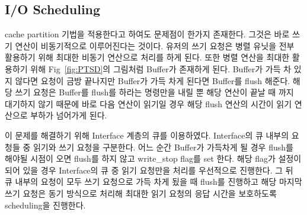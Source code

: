 \documentclass[conference]{IEEEtran}
\begin{document}
\subsection{I/O Scheduling}
cache partition 기법을 적용한다고 하여도 문제점이 한가지 존재한다. 그것은 바로 쓰기 연산이 비동기적으로 이루어진다는 것이다. 유저의 쓰기 요청은 병렬 유닛을 전부 활용하기 위해 최대한 비동기 연산으로 처리를 하게 된다. 또한 병렬 연산을 최대한 활용하기 위해 Fig~\ref{fig:PTSD}의 그림처럼 Buffer가 존재하게 된다. Buffer가 가득 차 있지 않다면 요청이 금방 끝나지만 Buffer가 가득 차게 된다면 Buffer를 flush 해준다. 해당 쓰기 요청은 Buffer를 flush를 하라는 명령만을 내릴 뿐 해당 연산이 끝날 때 까지 대기하지 않기 때문에 바로 다음 연산이 읽기일 경우 해당 flush 연산의 시간이 읽기 연산으로 부하가 넘어가게 된다.\par
이 문제를 해결하기 위해 Interface 계층의 큐를 이용하였다. Interface의 큐 내부의 요청들 중 읽기와 쓰기 요청을 구분한다. 어느 순간 Buffer가 가득차게 될 경우 flush를 해야될 시점이 오면 flush를 하지 않고 write\_stop flag를 set 한다. 해당 flag가 설정이 되어 있을 경우 Interface의 큐 중 읽기 요청만을 처리를 우선적으로 진행한다. 그 뒤 큐 내부의 요청이 모두 쓰기 요청으로 가득 차게 됬을 때 flush를 진행하고 해당 마지막 쓰기 요청은 동기 방식으로 처리해 최대한 읽기 요청의 응답 시간을 보호하도록 scheduling을 진행한다.\par
\end{document}
